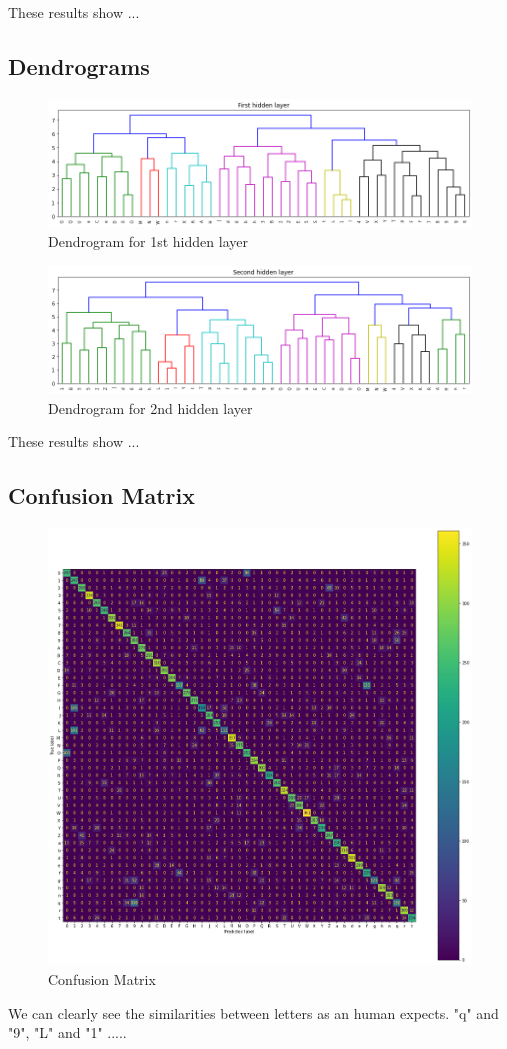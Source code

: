 \documentclass[a4paper, 11pt]{article}
\begin{document}
			These results show ...
		
		\subsection{Dendrograms}
		
			\begin{figure}[H]
				\centering
				\includegraphics[width=.99\linewidth]{dend1.png}  
				\caption{Dendrogram for 1st hidden layer}
				\label{fig:dend1}
			\end{figure}
		
			\begin{figure}[H]
				\centering
				\includegraphics[width=.99\linewidth]{dend2.png}  
				\caption{Dendrogram for 2nd hidden layer}
				\label{fig:dend2}
			\end{figure}
		
			These results show ...
		
		
		
		
		
		\subsection{Confusion Matrix}	
			\begin{figure}[H]
				\centering
				\includegraphics[width=.7\linewidth]{confmat.png}  
				\caption{Confusion Matrix}
				\label{fig:confmat}
			\end{figure}
			We can clearly see the similarities between letters as an human expects.
			"q" and "9", "L" and "1" .....
			
\end{document}

